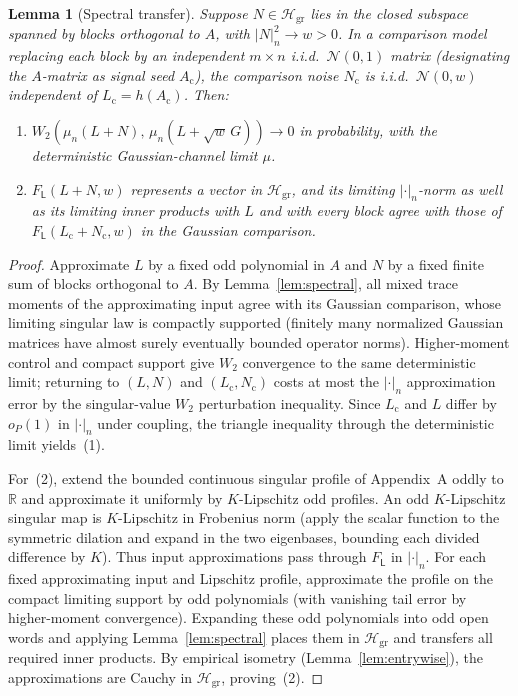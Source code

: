 \documentclass[11pt]{article}
\theoremstyle{plain}
\newtheorem{lemma}[theorem]{Lemma}
\theoremstyle{definition}
\theoremstyle{remark}
\newcommand{\R}{\mathbb{R}}
\newcommand{\sL}{\mathsf{L}}
\begin{document}
\begin{lemma}[Spectral transfer]\label{lem:spectral-transfer}
Suppose $N \in \mathcal{H}_{\mathrm{gr}}$ lies in the closed subspace spanned by blocks orthogonal to $A$, with $|N|_n^2 \to w > 0$. In a comparison model replacing each block by an independent $m \times n$ i.i.d.\ $\mathcal{N}(0,1)$ matrix (designating the $A$-matrix as signal seed $A_{\mathrm{c}}$), the comparison noise $N_{\mathrm{c}}$ is i.i.d.\ $\mathcal{N}(0, w)$ independent of $L_{\mathrm{c}} = h(A_{\mathrm{c}})$. Then:
\begin{enumerate}[label=\textup{(\arabic*)},leftmargin=2em,itemsep=1pt]
\item $W_2(\mu_n(L + N),\, \mu_n(L + \sqrt{w}\,G)) \to 0$ in probability, with the deterministic Gaussian-channel limit $\mu$.
\item $F_{\sL}(L + N, w)$ represents a vector in $\mathcal{H}_{\mathrm{gr}}$, and its limiting $|\cdot|_n$-norm as well as its limiting inner products with $L$ and with every block agree with those of $F_{\sL}(L_{\mathrm{c}} + N_{\mathrm{c}}, w)$ in the Gaussian comparison.
\end{enumerate}
\end{lemma}

\begin{proof}
Approximate $L$ by a fixed odd polynomial in $A$ and $N$ by a fixed finite sum of blocks orthogonal to $A$. By Lemma~\ref{lem:spectral}, all mixed trace moments of the approximating input agree with its Gaussian comparison, whose limiting singular law is compactly supported (finitely many normalized Gaussian matrices have almost surely eventually bounded operator norms). Higher-moment control and compact support give $W_2$ convergence to the same deterministic limit; returning to $(L, N)$ and $(L_{\mathrm{c}}, N_{\mathrm{c}})$ costs at most the $|\cdot|_n$ approximation error by the singular-value $W_2$ perturbation inequality. Since $L_{\mathrm{c}}$ and $L$ differ by $o_P(1)$ in $|\cdot|_n$ under coupling, the triangle inequality through the deterministic limit yields~(1).

For~(2), extend the bounded continuous singular profile of Appendix~A oddly to $\R$ and approximate it uniformly by $K$-Lipschitz odd profiles. An odd $K$-Lipschitz singular map is $K$-Lipschitz in Frobenius norm (apply the scalar function to the symmetric dilation and expand in the two eigenbases, bounding each divided difference by $K$). Thus input approximations pass through $F_{\sL}$ in $|\cdot|_n$. For each fixed approximating input and Lipschitz profile, approximate the profile on the compact limiting support by odd polynomials (with vanishing tail error by higher-moment convergence). Expanding these odd polynomials into odd open words and applying Lemma~\ref{lem:spectral} places them in $\mathcal{H}_{\mathrm{gr}}$ and transfers all required inner products. By empirical isometry (Lemma~\ref{lem:entrywise}), the approximations are Cauchy in $\mathcal{H}_{\mathrm{gr}}$, proving~(2).
\end{proof}
\end{document}
